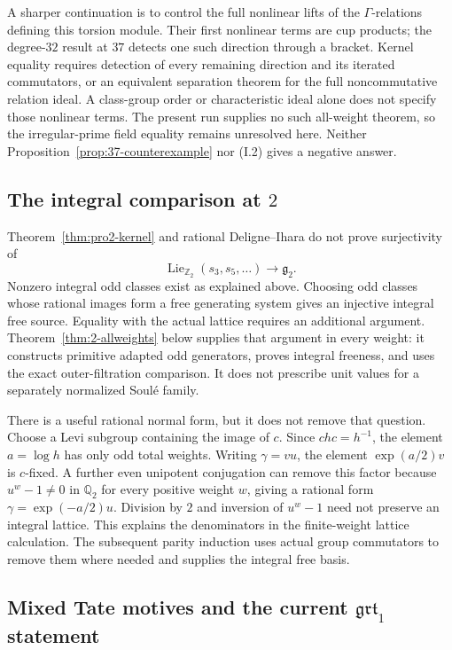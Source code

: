 A sharper continuation is to control the full nonlinear lifts of the $\Gamma$-relations defining this torsion module. Their first nonlinear terms are cup products; the degree-$32$ result at $37$ detects one such direction through a bracket. Kernel equality requires detection of every remaining direction and its iterated commutators, or an equivalent separation theorem for the full noncommutative relation ideal. A class-group order or characteristic ideal alone does not specify those nonlinear terms. The present run supplies no such all-weight theorem, so the irregular-prime field equality remains unresolved here. Neither Proposition~\ref{prop:37-counterexample} nor (I.2) gives a negative answer.

\subsection{The integral comparison at \texorpdfstring{$2$}{2}}

Theorem~\ref{thm:pro2-kernel} and rational Deligne--Ihara do not prove surjectivity of
\[
 \operatorname{Lie}_{\mathbb Z_2}(s_3,s_5,\ldots)
      \longrightarrow\mathfrak g_2.
\]
Nonzero integral odd classes exist as explained above. Choosing odd classes whose rational images form a free generating system gives an injective integral free source. Equality with the actual lattice requires an additional argument. Theorem~\ref{thm:2-allweights} below supplies that argument in every weight: it constructs primitive adapted odd generators, proves integral freeness, and uses the exact outer-filtration comparison. It does not prescribe unit values for a separately normalized Soul\'e family.

There is a useful rational normal form, but it does not remove that question. Choose a Levi subgroup containing the image of $c$. Since $chc=h^{-1}$, the element $a=\log h$ has only odd total weights. Writing $\gamma=vu$, the element $\exp(a/2)v$ is $c$-fixed. A further even unipotent conjugation can remove this factor because $u^w-1\neq0$ in $\mathbb Q_2$ for every positive weight $w$, giving a rational form $\gamma=\exp(-a/2)u$. Division by $2$ and inversion of $u^w-1$ need not preserve an integral lattice. This explains the denominators in the finite-weight lattice calculation. The subsequent parity induction uses actual group commutators to remove them where needed and supplies the integral free basis.

\subsection{Mixed Tate motives and the current \texorpdfstring{$\mathfrak{grt}_1$}{grt1} statement}

